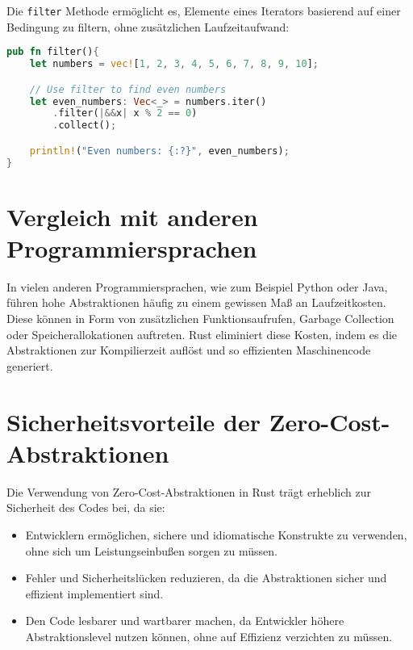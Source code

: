 Die \texttt{filter} Methode ermöglicht es, Elemente eines Iterators basierend auf einer Bedingung zu filtern, ohne zusätzlichen Laufzeitaufwand:

\begin{lstlisting}[language=Rust, caption=Filter-Funktion Beispiel]
pub fn filter(){
    let numbers = vec![1, 2, 3, 4, 5, 6, 7, 8, 9, 10];

    // Use filter to find even numbers
    let even_numbers: Vec<_> = numbers.iter()
        .filter(|&&x| x % 2 == 0)
        .collect();

    println!("Even numbers: {:?}", even_numbers);
}
\end{lstlisting}

\section{Vergleich mit anderen Programmiersprachen}

In vielen anderen Programmiersprachen, wie zum Beispiel Python oder Java, führen hohe Abstraktionen häufig zu einem gewissen Maß an Laufzeitkosten. 
Diese können in Form von zusätzlichen Funktionsaufrufen, Garbage Collection oder Speicherallokationen auftreten. 
Rust eliminiert diese Kosten, indem es die Abstraktionen zur Kompilierzeit auflöst und so effizienten Maschinencode generiert.

\section{Sicherheitsvorteile der Zero-Cost-Abstraktionen}

Die Verwendung von Zero-Cost-Abstraktionen in Rust trägt erheblich zur Sicherheit des Codes bei, da sie:
\begin{itemize}
    \item Entwicklern ermöglichen, sichere und idiomatische Konstrukte zu verwenden, ohne sich um Leistungseinbußen sorgen zu müssen.
    \item Fehler und Sicherheitslücken reduzieren, da die Abstraktionen sicher und effizient implementiert sind.
    \item Den Code lesbarer und wartbarer machen, da Entwickler höhere Abstraktionslevel nutzen können, ohne auf Effizienz verzichten zu müssen.
\end{itemize}
